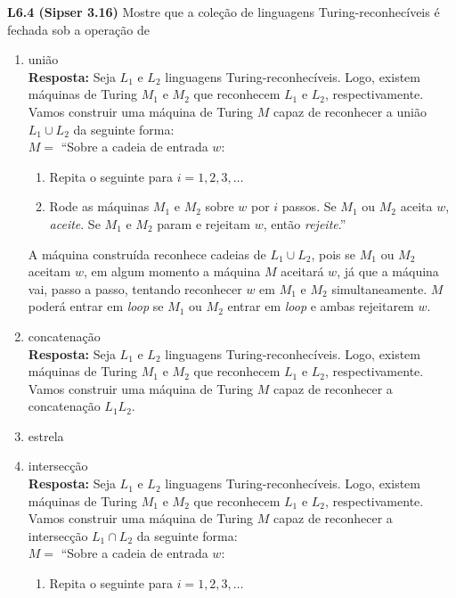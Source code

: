 
\noindent \textbf{L6.4 (Sipser 3.16)} Mostre que a coleção de linguagens Turing-reconhecíveis é fechada sob a operação de 
\begin{enumerate}[label={\textbf{\alph*.}}]
    \item união\\[3pt]
    \textbf{Resposta: } Seja $L_1$ e $L_2$ linguagens Turing-reconhecíveis. Logo, existem máquinas de Turing $M_1$ e $M_2$ que reconhecem $L_1$ e $L_2$, respectivamente. Vamos construir uma máquina de Turing $M$ capaz de reconhecer a união $L_1 \cup L_2$ da seguinte forma:\\[3pt]
    $M =$ “Sobre a cadeia de entrada $w$:
    \begin{enumerate}[label={\textbf{\arabic*.}}, leftmargin=1in]
        \item Repita o seguinte para $i = 1, 2, 3, \ldots$
    
        \item Rode as máquinas $M_1$ e $M_2$ sobre $w$ por $i$ passos. Se $M_1$ ou $M_2$ aceita $w$, \textit{aceite}. Se $M_1$ e $M_2$ param e rejeitam $w$, então \textit{rejeite}.”

    \end{enumerate}
    
    A máquina construída reconhece cadeias de $L_1 \cup L_2$, pois se $M_1$ ou $M_2$ aceitam $w$, em algum momento a máquina $M$ aceitará $w$, já que a máquina vai, passo a passo, tentando reconhecer $w$ em $M_1$ e $M_2$ simultaneamente. $M$ poderá entrar em \textit{loop} se $M_1$ ou $M_2$ entrar em \textit{loop} e ambas rejeitarem $w$.
    
    \item concatenação\\[3pt]
    \textbf{Resposta: } Seja $L_1$ e $L_2$ linguagens Turing-reconhecíveis. Logo, existem máquinas de Turing $M_1$ e $M_2$ que reconhecem $L_1$ e $L_2$, respectivamente. Vamos construir uma máquina de Turing $M$ capaz de reconhecer a concatenação $L_1L_2$.
    
    \item estrela
    
    \item intersecção\\[3pt]
    \textbf{Resposta: } Seja $L_1$ e $L_2$ linguagens Turing-reconhecíveis. Logo, existem máquinas de Turing $M_1$ e $M_2$ que reconhecem $L_1$ e $L_2$, respectivamente. Vamos construir uma máquina de Turing $M$ capaz de reconhecer a intersecção $L_1 \cap L_2$ da seguinte forma:\\[3pt]
    $M =$ “Sobre a cadeia de entrada $w$:
    \begin{enumerate}[label={\textbf{\arabic*.}}, leftmargin=1in]
        \item Repita o seguinte para $i = 1, 2, 3, \ldots$
    

\end{enumerate}
\end{enumerate}

